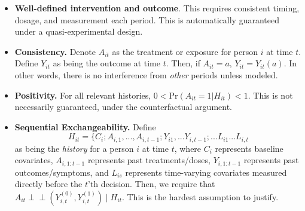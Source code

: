 \documentclass[12pt,letterpaper,doublespace, oneside]{article}
\begin{document}
\begin{itemize}

\item \textbf{Well-defined intervention and outcome}. This requires consistent timing, dosage, and measurement each period. This is automatically guaranteed under a quasi-experimental design. 

\item \textbf{Consistency.} Denote $A_{it}$ as the treatment or exposure for person $i$ at time $t$. Define $Y_{it}$ as being the outcome at time $t$. Then, if $A_{it} = a$, $Y_{it} = Y_{it}(a)$. In other words, there is no interference from \emph{other} periods unless modeled. 

\item \textbf{Positivity.} For all relevant histories, $0 < \text{Pr}(A_{it} = 1| H_{it}) < 1$. This is not necessarily guaranteed, under the counterfactual argument. 

\item \textbf{Sequential Exchangeability.}  Define \[H_{it} = \{ C_i; A_{i,1}, ..., A_{i,t-1}; Y_{i1}, ... Y_{i, t-1}; ... L_{i1} ... L_{i,t}\] as being the \emph{history} for a person $i$ at time $t$, where $C_i$ represents baseline covariates, $A_{i, 1:t-1}$ represents past treatments/doses, $Y_{i, 1: t-1}$ represents past outcomes/symptoms, and $L_{is}$ represents time-varying covariates measured directly before the $t$'th decision. Then, we require that $A_{it} \perp\!\!\!\perp (Y_{i,t}^{(0)}, Y_{i,t}^{(1)}) \mid H_{it}$. This is the hardest assumption to justify. 

\end{itemize}

\end{document}
